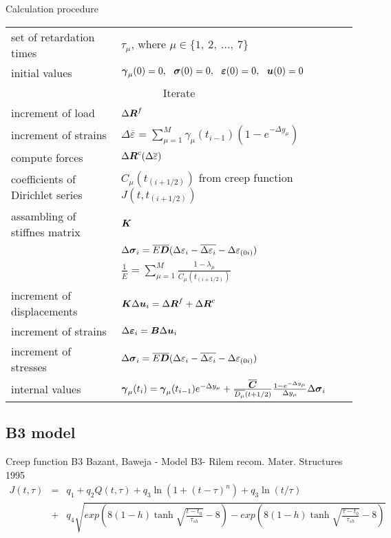 \begin{center}
Calculation procedure

\begin{tabular}{|l|l|}
\hline
set of retardation times &
$\tau_\mu$, where $\mu \in \{1,\ 2,\ \ldots,\ 7\}$
\\[3mm]
initial values &
$\mbf{\gamma}_\mu(0)=0,\ \ \mbf{\sigma}(0)=0,\ \ \mbf{\varepsilon}(0)=0,\ \ \mbf{u}(0)=0$
\\[3mm] \hline
\multicolumn{2}{|c|}{Iterate}
\\[3mm] \hline
increment of load &
$\Delta \mbox{\boldmath$R$}^f$
\\[3mm]
increment of strains &
$\Delta\overline{\varepsilon} = \sum_{\mu=1}^{M} {\gamma_{\mu}(t_{i-1})(1-e^{-\Delta y_\mu})}$
\\[3mm]
compute forces &
$\Delta \mbox{\boldmath$R$}^c (\Delta\overline{\varepsilon})$
\\[3mm]
coefficients of Dirichlet series &
$C_\mu(t_{(i+1/2)})$ from creep function $J(t,t_{(i+1/2)})$
\\[3mm]
assambling of stiffnes matrix &
$\mbox{\boldmath$K$}$
\\[3mm]
 &
$\Delta\mbox{\boldmath$\sigma$}_i = {\overline{E}\overline{\mbox{\boldmath$D$}}} (\Delta\varepsilon_i-\overline{\Delta\varepsilon_i}-\Delta\varepsilon_{(0i)})$
\\[3mm]
 &
$\frac{1}{\overline{E}} = \sum_{\mu=1}^{M} {\frac{1-\lambda_{\mu}}{C_{\mu}(t_{(i+1/2)})}}$
\\[3mm]
increment of displacements &
$\mbox{\boldmath$K$} \Delta  \mbox{\boldmath$u$}_i = \Delta \mbox{\boldmath$R$}^f + \Delta \mbox{\boldmath$R$}^c$
\\[3mm]
increment of strains &
$\Delta\mbox{\boldmath$\varepsilon$}_i = \mbox{\boldmath$B$} \Delta \mbox{\boldmath$u$}_i$
\\[3mm]
increment of stresses &
$\Delta\mbox{\boldmath$\sigma$}_i = {\overline{E}\overline{\mbox{\boldmath$D$}}} (\Delta\varepsilon_i-\overline{\Delta\varepsilon_i}-\Delta\varepsilon_{(0i)})$
\\[3mm]
internal values &
$\mbox{\boldmath$\gamma$}_\mu(t_i) = \mbox{\boldmath$\gamma$}_\mu (t_{i-1}) e^{-\Delta y_\mu} + \frac{\overline{\mbox{\boldmath$C$}}} {\overline{D_\mu}(t+1/2)}
{\frac{1-e^{-\Delta y_\mu}}{\Delta y_\mu} }  \Delta\mbox{\boldmath$\sigma$}_i$
\\ \hline
\end{tabular}
\end{center}

\subsection{B3 model}
Creep function B3
  Bazant, Baweja - Model B3- Rilem recom. Mater. Structures 1995
\\\begin{eqnarray}
J(t,\tau) &=& q_1 + q_2 Q(t,\tau) + q_3 \ln{ \left( 1+(t-\tau)^n \right)} + q_3 \ln{(t/\tau)}
\\ \nonumber
&+& q_4\sqrt{ exp{\left( 8(1-h)\tanh{ \sqrt{\frac{t-t_0}{\tau_{sh}} } } - 8  \right)} - exp{\left( 8(1-h)\tanh{ \sqrt{\frac{\tau-t_0}{\tau_{sh}} } } - 8  \right)}  }
\end{eqnarray}


